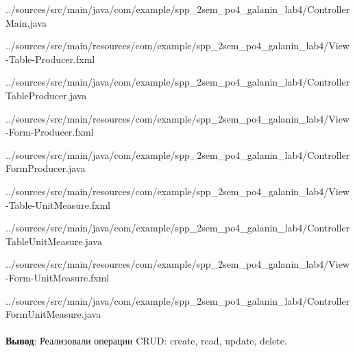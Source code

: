 \documentclass[12pt, a4paper, simple]{eskdtext}
\begin{document}
    
    {../sources/src/main/java/com/example/spp_2sem_po4_galanin_lab4/ControllerMain.java}


   
    
    {../sources/src/main/resources/com/example/spp_2sem_po4_galanin_lab4/View-Table-Producer.fxml}

    
    {../sources/src/main/java/com/example/spp_2sem_po4_galanin_lab4/ControllerTableProducer.java}


    
    {../sources/src/main/resources/com/example/spp_2sem_po4_galanin_lab4/View-Form-Producer.fxml}

    
    {../sources/src/main/java/com/example/spp_2sem_po4_galanin_lab4/ControllerFormProducer.java}


    
    {../sources/src/main/resources/com/example/spp_2sem_po4_galanin_lab4/View-Table-UnitMeasure.fxml}

    
    {../sources/src/main/java/com/example/spp_2sem_po4_galanin_lab4/ControllerTableUnitMeasure.java}


    
    {../sources/src/main/resources/com/example/spp_2sem_po4_galanin_lab4/View-Form-UnitMeasure.fxml}

    
    {../sources/src/main/java/com/example/spp_2sem_po4_galanin_lab4/ControllerFormUnitMeasure.java}


    \paragraph{} \textbf{Вывод}:
    Реализовали операции CRUD: create, read, update, delete.
\end{document}
